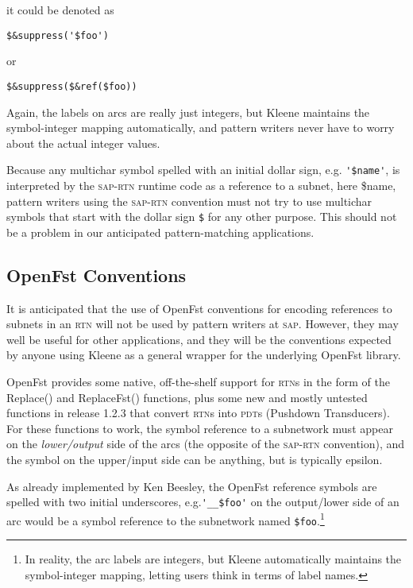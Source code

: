 \documentclass[letterpaper,12pt]{article}
\providecommand{\acro}{}\renewcommand{\acro}{\textsc}
\begin{document}
\noindent
it could be denoted as

\begin{Verbatim}[fontsize=\small]
$&suppress('$foo')
\end{Verbatim}

\noindent
or

\begin{Verbatim}[fontsize=\small]
$&suppress($&ref($foo))
\end{Verbatim}

\noindent
Again, the labels on arcs are really just integers, but Kleene maintains the
symbol-integer mapping automatically, and pattern writers never have to worry about
the actual integer values.

Because any multichar symbol spelled with an initial dollar sign, e.g.\@
\verb!'$name'!, is interpreted by the
\acro{sap-rtn} runtime code as a
reference to a subnet, here \$name, pattern writers using the
\acro{sap-rtn} convention must
not try to use
multichar symbols that start with the dollar sign \verb!$! for any other purpose.
This should not be a problem in our anticipated pattern-matching applications.


\subsection{OpenFst Conventions}

It is anticipated that the use of OpenFst conventions for encoding references to subnets
in an \acro{rtn} will not be used by pattern writers at \acro{sap}.  However, they may
well be useful for other applications, and they will be the conventions expected by anyone using Kleene as a
general wrapper for the underlying OpenFst library.

OpenFst provides some native, off-the-shelf support for \acro{rtn}s in the form of
the
Replace() and ReplaceFst() functions, plus some new and mostly untested functions in release
1.2.3 that convert
\acro{rtn}s into \acro{pdt}s (Pushdown Transducers).  For these functions to work, the symbol reference to a subnetwork
must appear on the \emph{lower/output} side of the arcs (the opposite of
the \acro{sap-rtn} convention), and the symbol on the
upper/input side can be anything, but is typically epsilon.

As already implemented by Ken Beesley, the OpenFst reference symbols are spelled with two
initial underscores, e.g.\@ \verb!'__$foo'! on the output/lower side of an arc would be a symbol reference to the subnetwork
named \verb!$foo!.\footnote{In reality, the arc labels are integers, but Kleene automatically
maintains the symbol-integer mapping, letting users think in terms of label names.}
\end{document}
